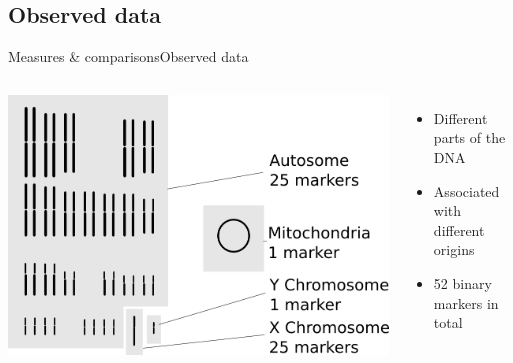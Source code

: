 \documentclass[10pt, aspectratio=43]{beamer}
\begin{document}
\subsection{Observed data}
\begin{frame}{Measures \& comparisons}{Observed data}
\begin{columns}
  \includegraphics[width=1\textwidth]{../data/markers.png}

  \begin{itemize}
    \item Different parts of the DNA
    \item Associated with different origins
    \item 52 binary markers in total
  \end{itemize}

\end{columns}
\end{frame}
\end{document}
